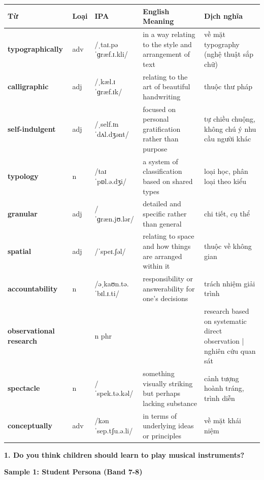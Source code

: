 \vspace{0.8em}
\begin{center}
\renewcommand{\arraystretch}{1.65}
\begin{tabularx}{\textwidth}{|V{0.22\textwidth}|C{0.07\textwidth}|I{0.20\textwidth}|Y|V{0.18\textwidth}|}
\hline
{}
\textbf{Từ} & \textbf{Loại} & \textbf{IPA} & \textbf{English Meaning} & \textbf{Dịch nghĩa} \\
\hline
\textbf{typographically} & adv & /ˌtaɪ.pəˈɡræf.ɪ.kli/ & in a way relating to the style and arrangement of text & về mặt typography (nghệ thuật sắp chữ) \\ \hline
\textbf{calligraphic} & adj & /ˌkæl.ɪˈɡræf.ɪk/ & relating to the art of beautiful handwriting & thuộc thư pháp \\ \hline
\textbf{self-indulgent} & adj & /ˌself.ɪnˈdʌl.dʒənt/ & focused on personal gratification rather than purpose & tự chiều chuộng, không chú ý nhu cầu người khác \\ \hline
\textbf{typology} & n & /taɪˈpɒl.ə.dʒi/ & a system of classification based on shared types & loại học, phân loại theo kiểu \\ \hline
\textbf{granular} & adj & /ˈɡræn.jʊ.lər/ & detailed and specific rather than general & chi tiết, cụ thể \\ \hline
\textbf{spatial} & adj & /ˈspeɪ.ʃəl/ & relating to space and how things are arranged within it & thuộc về không gian \\ \hline
\textbf{accountability} & n & /əˌkaʊn.tə.ˈbɪl.ɪ.ti/ & responsibility or answerability for one's decisions & trách nhiệm giải trình \\ \hline
\textbf{observational research} & & n phr & & research based on systematic direct observation | nghiên cứu quan sát \\ \hline
\textbf{spectacle} & n & /ˈspek.tə.kəl/ & something visually striking but perhaps lacking substance & cảnh tượng hoành tráng, trình diễn \\ \hline
\textbf{conceptually} & adv & /kənˈsep.tʃu.ə.li/ & in terms of underlying ideas or principles & về mặt khái niệm \\ \hline
\end{tabularx}
\end{center}

\partthreeheader

\begin{ieltsquestion}
\textbf{1. Do you think children should learn to play musical instruments?}
\end{ieltsquestion}
\textbf{Sample 1: Student Persona (Band 7-8)}

